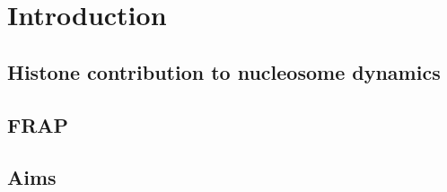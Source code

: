\section{Introduction}

  \subsection{Histone contribution to nucleosome dynamics}

  \subsection{FRAP}

  \subsection{Aims}

